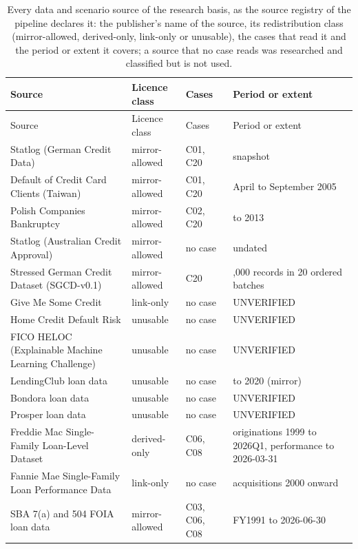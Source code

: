 {\footnotesize
\setlength{\tabcolsep}{3pt}
\renewcommand{\arraystretch}{1.12}
\begin{longtable}{>{\raggedright\arraybackslash}p{6.4cm}>{\raggedright\arraybackslash}p{2.2cm}>{\raggedright\arraybackslash}p{2.8cm}>{\raggedright\arraybackslash}p{3.0cm}}
\caption{Every data and scenario source of the research basis, as the source registry of the pipeline declares it: the publisher's name of the source, its redistribution class (mirror-allowed, derived-only, link-only or unusable), the cases that read it and the period or extent it covers; a source that no case reads was researched and classified but is not used.}\label{tab:data-sources}\\
\toprule
Source & Licence class & Cases & Period or extent \\
\midrule
\endfirsthead
\toprule
Source & Licence class & Cases & Period or extent \\
\midrule
\endhead
\bottomrule
\endfoot
Statlog (German Credit Data) & mirror-allowed & C01, C20 & 1994 snapshot \\
Default of Credit Card Clients (Taiwan) & mirror-allowed & C01, C20 & April to September 2005 \\
Polish Companies Bankruptcy & mirror-allowed & C02, C20 & 2000 to 2013 \\
Statlog (Australian Credit Approval) & mirror-allowed & no case & undated \\
Stressed German Credit Dataset (SGCD-v0.1) & mirror-allowed & C20 & 1,000 records in 20 ordered batches \\ %
Give Me Some Credit & link-only & no case & UNVERIFIED \\
Home Credit Default Risk & unusable & no case & UNVERIFIED \\
FICO HELOC (Explainable Machine Learning Challenge) & unusable & no case & UNVERIFIED \\
LendingClub loan data & unusable & no case & 2007 to 2020 (mirror) \\
Bondora loan data & unusable & no case & UNVERIFIED \\
Prosper loan data & unusable & no case & UNVERIFIED \\
Freddie Mac Single-Family Loan-Level Dataset & derived-only & C06, C08 & originations 1999 to 2026Q1, performance to 2026-03-31 \\
Fannie Mae Single-Family Loan Performance Data & link-only & no case & acquisitions 2000 onward \\
SBA 7(a) and 504 FOIA loan data & mirror-allowed & C03, C06, C08 & FY1991 to 2026-06-30 \\

\end{longtable}}
